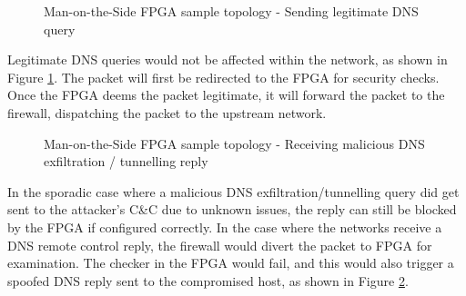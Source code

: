 \documentclass[a4paper]{report}
\begin{document}
\begin{figure}[H]
  \caption{Man-on-the-Side FPGA sample topology - Sending legitimate DNS query}
  \label{fig:man-on-the-side-FPGA-send-legit}
\end{figure}

Legitimate DNS queries would not be affected within the network, as shown in Figure \ref{fig:man-on-the-side-FPGA-send-legit}. The packet will first be redirected to the FPGA for security checks. Once the FPGA deems the packet legitimate, it will forward the packet to the firewall, dispatching the packet to the upstream network. 

\begin{figure}[H]
  \caption{Man-on-the-Side FPGA sample topology - Receiving malicious DNS exfiltration / tunnelling reply}
  \label{fig:man-on-the-side-FPGA-recv-malicious}
\end{figure}

In the sporadic case where a malicious DNS exfiltration/tunnelling query did get sent to the attacker's C\&C due to unknown issues, the reply can still be blocked by the FPGA if configured correctly. In the case where the networks receive a DNS remote control reply, the firewall would divert the packet to FPGA for examination. The checker in the FPGA would fail, and this would also trigger a spoofed DNS reply sent to the compromised host, as shown in Figure \ref{fig:man-on-the-side-FPGA-recv-malicious}.
\end{document}
